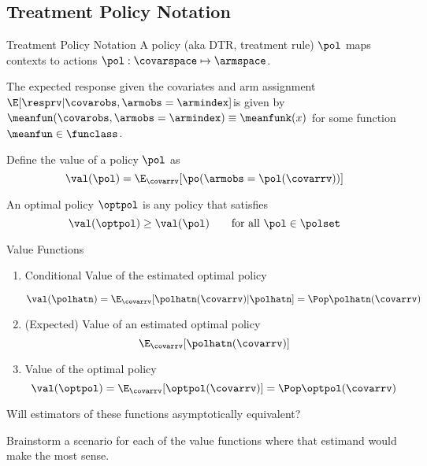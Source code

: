 \documentclass[aspectratio=169, professionalfonts]{beamer}
\begin{document}
\subsection{Treatment Policy Notation}

\begin{frame}{Treatment Policy Notation}
	A policy (aka DTR, treatment rule) $\pol$ maps contexts to actions $\pol: \covarspace \mapsto \armspace$.

	\vfill \pause
	The expected response given
	the covariates and arm assignment $\E[\resprv \vert \covarobs, \armobs =
			\armindex]$is given by $\meanfun(\covarobs, \armobs = \armindex) \equiv \meanfunk(x)$
	for some function $\meanfun \in \funclass$.

	\vfill \pause
	Define the value of a policy $\pol$ as
	\begin{equation}
		\val(\pol) = \E_{\covarrv}[\po(\armobs = \pol(\covarrv))]
	\end{equation}

	\vfill \pause
	An optimal policy $\optpol$ is any policy that satisfies
	\begin{equation}
		\val(\optpol) \geq \val(\pol) \qquad \text{for all }\pol \in \polset
	\end{equation}
\end{frame}

\begin{frame}{Value Functions}
	\begin{enumerate}
		\item Conditional Value of the estimated optimal policy

		      $$\val(\polhatn) = \E_{\covarrv}[\polhatn(\covarrv) \vert \polhatn] = \Pop \polhatn(\covarrv)$$

		      \vfill \pause

		\item (Expected) Value of an estimated optimal policy
		      $$\E_{\covarrv}[\polhatn(\covarrv)]$$

		      \vfill \pause

		\item Value of the optimal policy
		      $$\val(\optpol) = \E_{\covarrv}[\optpol(\covarrv)] = \Pop \optpol(\covarrv)$$
	\end{enumerate}

	\vfill \pause

	Will estimators of these functions asymptotically equivalent?

	\vfill \pause
	Brainstorm a scenario for each of the value functions where that estimand
	would 	make the most sense.
\end{frame}
\end{document}
